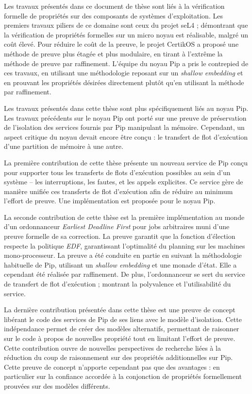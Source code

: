 
Les travaux présentés dans ce document de thèse sont liés à la vérification formelle de propriétés sur des composants de systèmes d'exploitation. Les premiers travaux piliers de ce domaine sont ceux du projet seL4 ; démontrant que la vérification de propriétés formelles sur un micro noyau est réalisable, malgré un coût élevé. Pour réduire le coût de la preuve, le projet CertikOS a proposé une méthode de preuve plus étagée et plus modulaire, en tirant à l'extrême la méthode de preuve par raffinement. L'équipe du noyau Pip a pris le contrepied de ces travaux, en utilisant une méthodologie reposant sur un \emph{shallow embedding} et en prouvant les propriétés désirées directement plutôt qu'en utilisant la méthode par raffinement.

Les travaux présentés dans cette thèse sont plus spécifiquement liés au noyau Pip. Les travaux précédents sur le noyau Pip ont porté sur une preuve de préservation de l'isolation des services fournis par Pip manipulant la mémoire. Cependant, un aspect critique du noyau devait encore être conçu : le transfert de flot d'exécution d'une partition de mémoire à une autre.

La première contribution de cette thèse présente un nouveau service de Pip conçu pour supporter tous les transferts de flots d'exécution possibles au sein d'un système -- les interruptions, les fautes, et les appels explicites. Ce service gère de manière unifiée ces transferts de flot d'exécution afin de réduire au minimum l'effort de preuve. Une implémentation est proposée pour le noyau Pip.

La seconde contribution de cette thèse est la première implémentation au monde d'un ordonnanceur \emph{Earliest Deadline First} pour jobs arbitraires muni d'une preuve formelle de sa correction. La preuve garantit que la fonction d'élection respecte la politique \emph{EDF}, garantissant l'optimalité du planning sur les machines mono-processeur. La preuve a été conduite en partie en suivant la méthodologie habituelle de Pip, utilisant un \emph{shallow embedding} et une monade d'état. Elle a cependant été réalisée par raffinement. De plus, l'ordonnanceur se sert du service de transfert de flot d'exécution ; montrant la polyvalence et l'utilisabilité du service.

La dernière contribution présentée dans cette thèse est une preuve de concept libérant le code des services de Pip de ses liens avec le modèle d'isolation. Cette indépendance permet de créer des modèles alternatifs, permettant de raisonner sur le code à propos de nouvelles propriété tout en limitant l'effort de preuve. Cette contribution ouvre de nouvelles perspectives de recherche liées à la réduction du coup de raisonnement sur des propriétés additionnelles sur Pip. Cette preuve de concept n'apporte cependant pas que des avantages : en particulier sur la confiance accordée à la conjonction de propriétés formellement prouvées sur des modèles différents.

